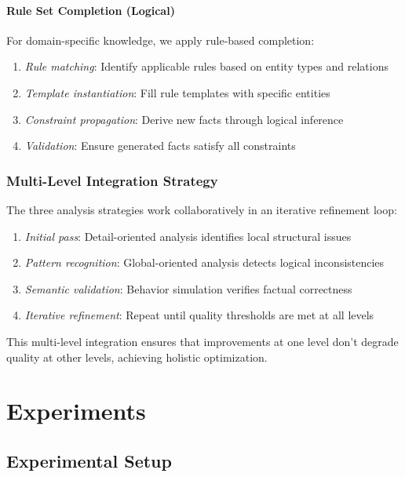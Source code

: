 \documentclass[runningheads]{llncs}
\begin{document}
\paragraph{Rule Set Completion (Logical)}
For domain-specific knowledge, we apply rule-based completion:
\begin{enumerate}
    \item \textit{Rule matching}: Identify applicable rules based on entity types and relations
    \item \textit{Template instantiation}: Fill rule templates with specific entities
    \item \textit{Constraint propagation}: Derive new facts through logical inference
    \item \textit{Validation}: Ensure generated facts satisfy all constraints
\end{enumerate}

\subsubsection{Multi-Level Integration Strategy}

The three analysis strategies work collaboratively in an iterative refinement loop:
\begin{enumerate}
    \item \textit{Initial pass}: Detail-oriented analysis identifies local structural issues
    \item \textit{Pattern recognition}: Global-oriented analysis detects logical inconsistencies
    \item \textit{Semantic validation}: Behavior simulation verifies factual correctness
    \item \textit{Iterative refinement}: Repeat until quality thresholds are met at all levels
\end{enumerate}

This multi-level integration ensures that improvements at one level don't degrade quality at other levels, achieving holistic optimization.

\section{Experiments}

\subsection{Experimental Setup}
\end{document}
